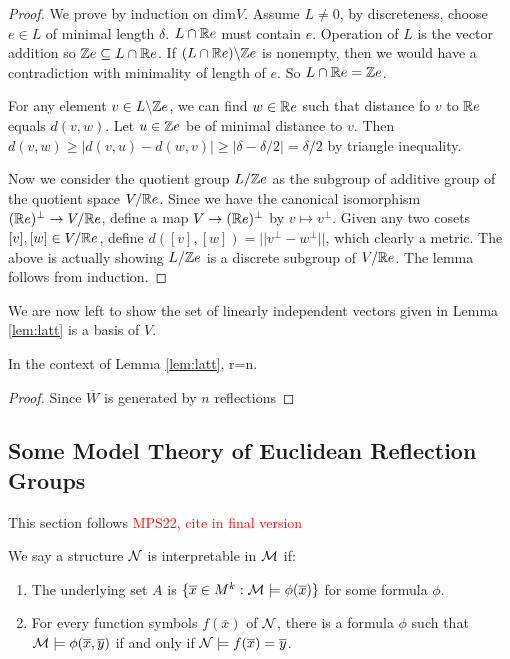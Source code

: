 \documentclass[../main.tex]{subfiles}
\begin{document}
\begin{proof}
    We prove by induction on $\text{dim}V$. Assume $L \neq 0$, by discreteness, choose $e\in L$ of minimal length $\delta$. $L\cap \mathbb{R} e$ must contain $e$. Operation of $L$ is the vector addition so $\mathbb{Z} e \subseteq L\cap \mathbb{R} e$. If $(L\cap \mathbb{R} e) \backslash \mathbb{Z} e$ is nonempty, then we would have a contradiction with minimality of length of $e$. So $L\cap \mathbb{R} e = \mathbb{Z} e$. 

    For any element $v\in L \backslash \mathbb{Z} e$, we can find $w\in \mathbb{R} e$ such that distance fo $v$ to $\mathbb{R} e$ equals $d(v,w)$. Let $u\in\mathbb{Z} e$ be of minimal distance to $v$. Then $d(v,w)\geq |d(v,u)-d(w,v)| \geq |\delta-\delta/2|=\delta/2$ by triangle inequality.

    Now we consider the quotient group $L/\mathbb{Z} e$ as the subgroup of additive group of the quotient space $V/ \mathbb{R} e$. Since we have the canonical isomorphism $(\mathbb{R} e)^{\perp} \rightarrow V/\mathbb{R} e$, define a map $V\rightarrow (\mathbb{R} e)^{\perp}$ by $v \mapsto v^{\perp}$. Given any two cosets $[v],[w]\in V/\mathbb{R} e$, define $d([v],[w])=||v^{\perp}-w^{\perp}||$, which clearly a metric. The above is actually showing $L/\mathbb{Z} e$ is a discrete subgroup of $V/\mathbb{R} e$. The lemma follows from induction.
\end{proof}

We are now left to show the set of linearly independent vectors given in Lemma \ref{lem:latt} is a basis of $V$.

\begin{lemma}
    In the context of Lemma \ref{lem:latt}, r=n.
\end{lemma}

\begin{proof}
    Since $\overline{W}$ is generated by $n$ reflections
\end{proof}


\subsection{Some Model Theory of Euclidean Reflection Groups}


This section follows \textcolor{red}{MPS22, cite in final version}

\begin{definition}
    We say a structure $\mathcal{N}$ is interpretable in $\mathcal{M}$ if:\begin{enumerate}
        \item The underlying set $A$ is $\{\overline x \in M^k:\mathcal{M}\models \phi(\overline x)\}$ for some formula $\phi$.
        \item For every function symbols $f(\overline x)$ of $\mathcal{N}$, there is a formula $\phi$ such that $\mathcal{M} \models \phi(\overline x,\overline y)$ if and only if $\mathcal{N} \models f(\overline x)=\overline y$.
    \end{enumerate}
\end{definition}
\end{document}

